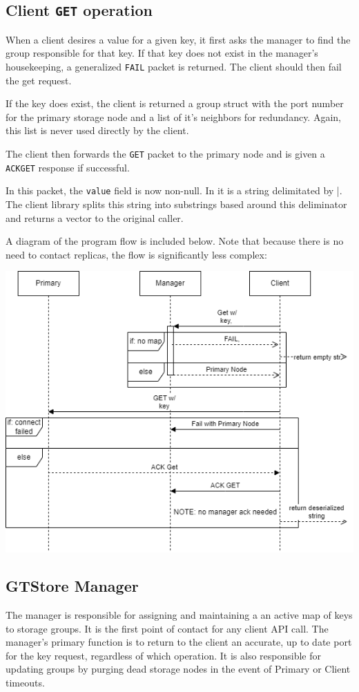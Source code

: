 \documentclass{article}
\begin{document}
\pagebreak
\subsection{Client \texttt{GET} operation}
When a client desires a value for a given key, it first asks the manager to find the group responsible for that key.
If that key does not exist in the manager's housekeeping, a generalized \texttt{FAIL} packet is returned. The client should then fail the get request.

If the key does exist, the client is returned a group struct with the port number for the primary storage node and a list of it's neighbors for redundancy. 
Again, this list is never used directly by the client.

The client then forwards the \texttt{GET} packet to the primary node and is given a \texttt{ACKGET} response if successful.

In this packet, the \texttt{value} field is now non-null. 
In it is a string delimitated by |. 
The client library splits this string into substrings based around this deliminator and returns a vector to the original caller.

A diagram of the program flow is included below. Note that because there is no need to contact replicas, 
the flow is significantly less complex:\\
\begin{center}
    \includegraphics[scale=0.7]{img/Get.drawio.png}
\end{center}

\subsection{GTStore Manager}
The manager is responsible for assigning and maintaining a an active map of keys to storage groups. It is the first point of contact for any client API call.
The manager's primary function is to return to the client an accurate, up to date port for the key request, regardless of which operation. It is also responsible for updating
groups by purging dead storage nodes in the event of Primary or Client timeouts.
\end{document}
